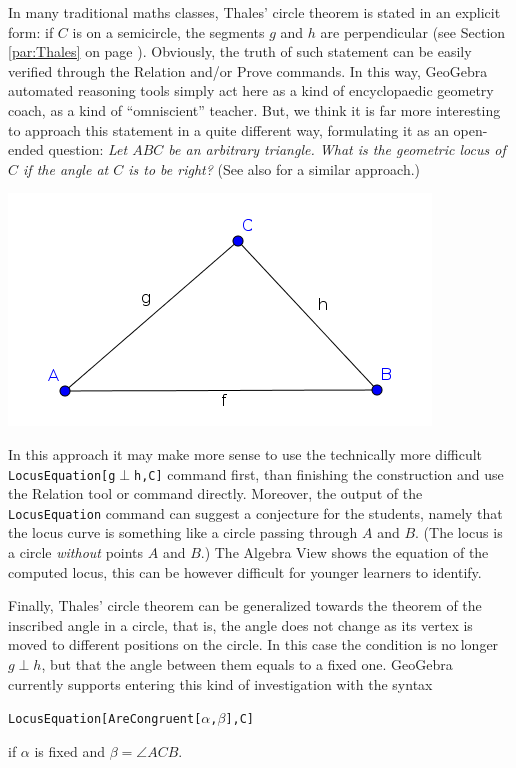 \documentclass{article}
\begin{document}
In many traditional maths classes, Thales' circle theorem is stated in an explicit form: if $C$ is on a semicircle, the segments $g$ and $h$ are perpendicular (see Section \ref{par:Thales} on page
\pageref{par:Thales}). Obviously,  the truth of such statement can be easily verified through the Relation and/or Prove commands. In this way, GeoGebra automated reasoning tools simply act here as a kind of encyclopaedic geometry coach, as a kind of ``omniscient'' teacher.  But, we think it is far more interesting to approach this statement in a quite different way, formulating it as an open-ended question: \textit{Let $ABC$ be an arbitrary triangle. What is the geometric locus of $C$ if the angle at $C$ is to be right?} (See also
\cite{Artigue} for a similar approach.)
\begin{center}
\includegraphics[scale=0.5]{Thales-triangle}
\end{center}
In this approach it may make more sense to use the technically more difficult \texttt{LocusEquation[g$\perp$h,C]} command first, than finishing the construction and use the Relation tool or command directly. Moreover, the output of the \texttt{LocusEquation} command can suggest a conjecture for the students, namely that the locus curve is something like a circle passing through $A$ and $B$. (The locus
is a circle \textit{without} points $A$ and $B$.) The Algebra View shows the equation of the
computed locus, this can be however difficult for younger learners to identify.

Finally, Thales' circle theorem can be generalized towards the theorem of the inscribed angle in a circle,
that is, the angle does not change as its vertex is moved to different positions on the circle.
In this case the condition is no longer $g\perp h$, but that the angle between them equals to a fixed one. GeoGebra currently supports entering this kind of investigation with the syntax
\begin{center}
\texttt{LocusEquation[AreCongruent[$\alpha$,$\beta$],C]}
\end{center}
if $\alpha$ is fixed and $\beta=\angle{ACB}$.
\end{document}
